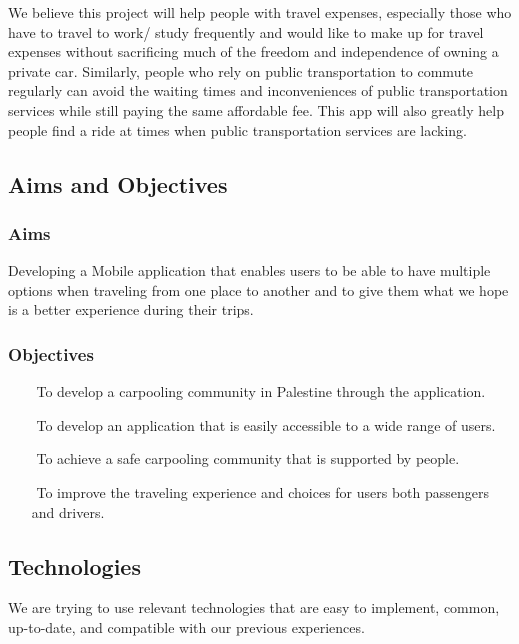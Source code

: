 \documentclass[a4paper, 12pt]{article} %
\begin{document}
            We believe this project will help people with travel expenses, especially those who have to travel to work/ study frequently and would like to make up for travel expenses without sacrificing much of the freedom and independence of owning a private car. Similarly, people who rely on public transportation to commute regularly can avoid the waiting times and inconveniences of public transportation services while still paying the same affordable fee. This app will also greatly help people find a ride at times when public transportation services are lacking. 
            
        \subsection{Aims and Objectives}
            \subsubsection{Aims}
                Developing a Mobile application that enables users to be able to have multiple options when traveling from one place to another and to give them what we hope is a better experience during their trips.
                
            \subsubsection{Objectives}
                \begin{itemize}
                    \item [$ $] To develop a carpooling community in Palestine through the application.
                     \item [$ $] To develop an application that is easily accessible to a wide range of users.
                     \item [$ $] To achieve a safe carpooling community that is supported by people.
                     \item [$ $] To improve the traveling experience and choices for users both passengers and drivers.
                \end{itemize}

        \subsection{Technologies}
            We are trying to use relevant technologies that are easy to implement, common, up-to-date, and compatible with our previous experiences.
\end{document}
